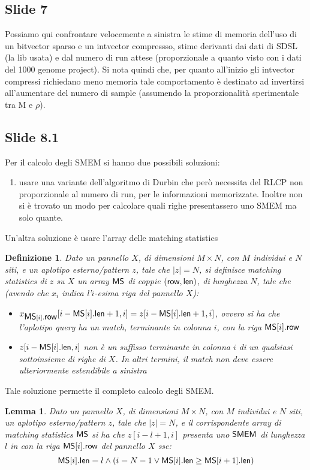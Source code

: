\documentclass[a4paper,11pt, oneside,italian]{article}
\newtheorem{definizione}{Definizione}
\newtheorem{lemma}{Lemma}
\def\len{\mbox{\rm {\sf len}}}
\def\row{\mbox{\rm {\sf row}}}
\def\MS{\mbox{\rm {\sf MS}}}
\def\SMEM{\mbox{\rm {\sf SMEM}}}
\begin{document}
\subsection*{Slide 7}
Possiamo qui confrontare velocemente a sinistra le stime di memoria dell'uso di
un bitvector sparso e un intvector compressso, stime derivanti dai dati di SDSL
(la lib usata) e dal numero di run attese (proporzionale a quanto visto con i
dati del 1000 genome project). Si nota quindi che, per quanto all'inizio gli
intvector compressi richiedano meno memoria tale comportamento è destinato ad
invertirsi all'aumentare del numero di sample (assumendo la proporzionalità
sperimentale tra M e $\rho$).
\subsection*{Slide 8.1}
Per il calcolo degli SMEM si hanno due possibili soluzioni:
\begin{enumerate}
  \item usare una variante dell'algoritmo di Durbin che però necessita del RLCP
  non proporzionale al numero di run, per le informazioni memorizzate. Inoltre
  non si è trovato un modo per 
  calcolare quali righe presentassero uno SMEM ma solo quante.
\end{enumerate}
Un'altra soluzione è usare l'array delle matching statistics
\begin{definizione}
  Dato un pannello $X$, di dimensioni $M\times N$, con $M$ individui e $N$ siti,
  e un aplotipo esterno/pattern $z$, tale che $|z|=N$, si definisce matching
  statistics di $z$ su $X$ un array $\MS$ di coppie $(\row,\len)$, di lunghezza
  $N$, tale che (avendo che $x_i$ indica l'$i$-esima riga del pannello $X$): 
  \begin{itemize}
    \item $x_{\MS[i].\row}[i-\MS[i].\len+1,i]=z[i-\MS[i].\len+1,i]$, ovvero si
    ha che 
    l'aplotipo query ha un match, terminante in colonna $i$, con la riga
    $\MS[i].\row$  
    \item $z[i-\MS[i].\len,i]$ non è un suffisso terminante in colonna $i$ di un
    qualsiasi sottoinsieme di righe di $X$. In altri termini, il match non deve
    essere ulteriormente estendibile a sinistra
  \end{itemize}
\end{definizione}
Tale soluzione permette il completo calcolo degli SMEM.
\begin{lemma}
  Dato un pannello $X$, di dimensioni $M\times N$, con $M$ individui e $N$
  siti, un aplotipo esterno/pattern $z$, tale che $|z|=N$, e il corrispondente
  array di matching statistics $\MS$ si ha che $z[i-l+1,i]$
  presenta uno $\SMEM$ di lunghezza $l$ in con la riga $\MS[i].\row$ del
  pannello $X$ sse: 
  \[\MS[i].\len=l\land(i=N-1\lor \MS[i].\len\geq \MS[i+1].\len)\]
\end{lemma}
\end{document}
